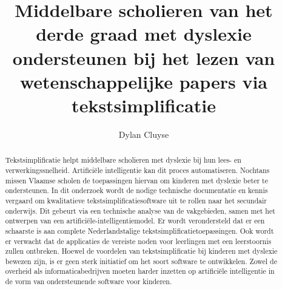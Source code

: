 \documentclass{hogent-article}
\title{Middelbare scholieren van het derde graad met dyslexie ondersteunen bij het lezen van wetenschappelijke papers via tekstsimplificatie}
\author{Dylan Cluyse}
\begin{document}
\begin{abstract}
 Tekstsimplificatie helpt middelbare scholieren met dyslexie bij hun lees- en verwerkingssnelheid. Artificiële intelligentie kan dit proces automatiseren. Nochtans missen Vlaamse scholen de toepassingen hiervan om kinderen met dyslexie beter te ondersteunen. In dit onderzoek wordt de nodige technische documentatie en kennis vergaard om kwalitatieve tekstsimplificatiesoftware uit te rollen naar het secundair onderwijs. Dit gebeurt via een technische analyse van de vakgebieden, samen met het ontwerpen van een artificiële-intelligentiemodel. Er wordt verondersteld dat er een schaarste is aan complete Nederlandstalige tekstsimplificatietoepassingen. Ook wordt er verwacht dat de applicaties de vereiste noden voor leerlingen met een leerstoornis zullen ontbreken. Hoewel de voordelen van tekstsimplificatie bij kinderen met dyslexie bewezen zijn, is er geen sterk initiatief om het soort software te ontwikkelen. Zowel de overheid als informaticabedrijven moeten harder inzetten op artificiële intelligentie in de vorm van ondersteunende software voor kinderen.
\end{abstract}

\tableofcontents



\printbibliography[heading=bibintoc]
\end{document}
